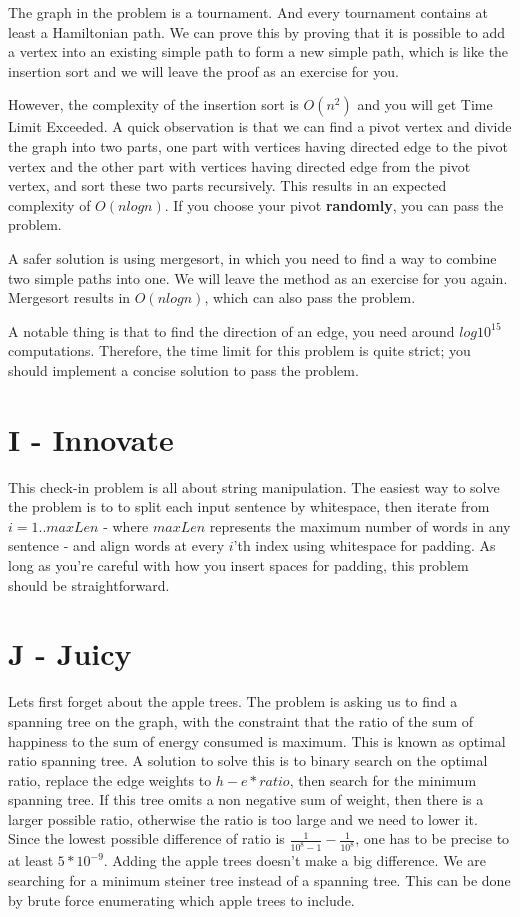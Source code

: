 \documentclass{article}
\begin{document}
The graph in the problem is a tournament. And every tournament contains at least a Hamiltonian path. We can prove this by proving that it is possible to add a vertex into an existing simple path to form a new simple path, which is like the insertion sort and we will leave the proof as an exercise for you.

\par
However, the complexity of the insertion sort is $O(n^2)$ and you will get Time Limit Exceeded. A quick observation is that we can find a pivot vertex and divide the graph into two parts, one part with vertices having directed edge to the pivot vertex and the other part with vertices having directed edge from the pivot vertex, and sort these two parts recursively. This results in an expected complexity of $O(nlogn)$. If you choose your pivot \textbf{randomly}, you can pass the problem.

\par
A safer solution is using mergesort, in which you need to find a way to combine two simple paths into one. We will leave the method as an exercise for you again. Mergesort results in $O(nlogn)$, which can also pass the problem.

\par
A notable thing is that to find the direction of an edge, you need around $log10^{15}$ computations. Therefore, the time limit for this problem is quite strict; you should implement a concise solution to pass the problem.

\section*{I - Innovate}
This check-in problem is all about string manipulation. The easiest way to solve the problem is to to split each input sentence by whitespace, then iterate from $i=1..maxLen$ - where $maxLen$ represents the maximum number of words in any sentence - and align words at every $i$'th index using whitespace for padding. As long as you're careful with how you insert spaces for padding, this problem should be straightforward.

\section*{J - Juicy}
Lets first forget about the apple trees. The problem is asking us to find a spanning tree on the graph, with the constraint that the ratio of the sum of happiness to the sum of energy consumed is maximum. This is known as optimal ratio spanning tree. A solution to solve this is to binary search on the optimal ratio, replace the edge weights to $h - e * ratio$, then search for the minimum spanning tree. If this tree omits a non negative sum of weight, then there is a larger possible ratio, otherwise the ratio is too large and we need to lower it. Since the lowest possible difference of ratio is $\frac{1}{10^8 - 1} - \frac{1}{10^8}$, one has to be precise to at least $5 * 10^{-9}$. Adding the apple trees doesn't make a big difference. We are searching for a minimum steiner tree instead of a spanning tree. This can be done by brute force enumerating which apple trees to include. 
\end{document}
